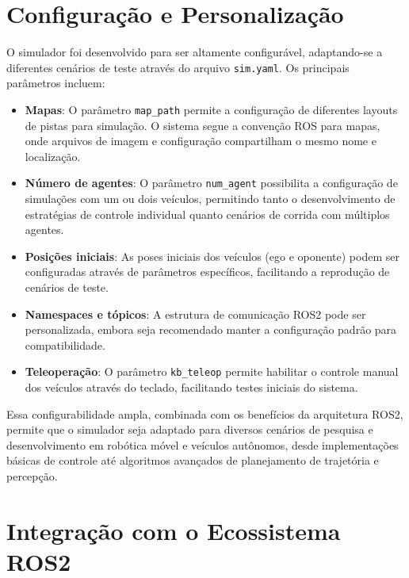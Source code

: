 \section{Configuração e Personalização}

O simulador foi desenvolvido para ser altamente configurável, adaptando-se a
diferentes cenários de teste através do arquivo \texttt{sim.yaml}. Os
principais parâmetros incluem:

\begin{itemize}
    \item \textbf{Mapas}: O parâmetro \texttt{map\_path} permite a configuração de diferentes layouts de pistas para simulação. O sistema segue a convenção ROS para mapas, onde arquivos de imagem e configuração compartilham o mesmo nome e localização.

    \item \textbf{Número de agentes}: O parâmetro \texttt{num\_agent} possibilita a configuração de simulações com um ou dois veículos, permitindo tanto o desenvolvimento de estratégias de controle individual quanto cenários de corrida com múltiplos agentes.

    \item \textbf{Posições iniciais}: As poses iniciais dos veículos (ego e oponente) podem ser configuradas através de parâmetros específicos, facilitando a reprodução de cenários de teste.

    \item \textbf{Namespaces e tópicos}: A estrutura de comunicação ROS2 pode ser personalizada, embora seja recomendado manter a configuração padrão para compatibilidade.

    \item \textbf{Teleoperação}: O parâmetro \texttt{kb\_teleop} permite habilitar o controle manual dos veículos através do teclado, facilitando testes iniciais do sistema.
\end{itemize}

Essa configurabilidade ampla, combinada com os benefícios da arquitetura ROS2,
permite que o simulador seja adaptado para diversos cenários de pesquisa e
desenvolvimento em robótica móvel e veículos autônomos, desde implementações
básicas de controle até algoritmos avançados de planejamento de trajetória e
percepção.

\section{Integração com o Ecossistema ROS2}

